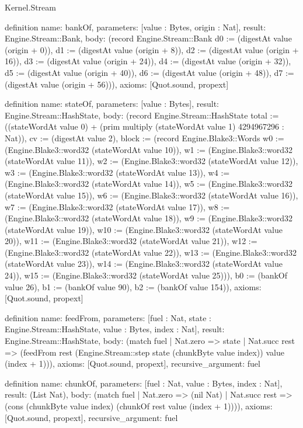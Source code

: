 \begin{lexlean}{Kernel.Stream}
\begin{semanticmodule}
definition{
  name: bankOf,
  parameters: [value : Bytes, origin : Nat],
  result: Engine.Stream::Bank,
  body: (record Engine.Stream::Bank {d0 := (digestAt value (origin + 0)), d1 := (digestAt value (origin + 8)), d2 := (digestAt value (origin + 16)), d3 := (digestAt value (origin + 24)), d4 := (digestAt value (origin + 32)), d5 := (digestAt value (origin + 40)), d6 := (digestAt value (origin + 48)), d7 := (digestAt value (origin + 56))}),
  axioms: [Quot.sound, propext]
}

definition{
  name: stateOf,
  parameters: [value : Bytes],
  result: Engine.Stream::HashState,
  body: (record Engine.Stream::HashState {total := ((stateWordAt value 0) + (prim multiply (stateWordAt value 1) 4294967296 : Nat)), cv := (digestAt value 2), block := (record Engine.Blake3::Words {w0 := (Engine.Blake3::word32 (stateWordAt value 10)), w1 := (Engine.Blake3::word32 (stateWordAt value 11)), w2 := (Engine.Blake3::word32 (stateWordAt value 12)), w3 := (Engine.Blake3::word32 (stateWordAt value 13)), w4 := (Engine.Blake3::word32 (stateWordAt value 14)), w5 := (Engine.Blake3::word32 (stateWordAt value 15)), w6 := (Engine.Blake3::word32 (stateWordAt value 16)), w7 := (Engine.Blake3::word32 (stateWordAt value 17)), w8 := (Engine.Blake3::word32 (stateWordAt value 18)), w9 := (Engine.Blake3::word32 (stateWordAt value 19)), w10 := (Engine.Blake3::word32 (stateWordAt value 20)), w11 := (Engine.Blake3::word32 (stateWordAt value 21)), w12 := (Engine.Blake3::word32 (stateWordAt value 22)), w13 := (Engine.Blake3::word32 (stateWordAt value 23)), w14 := (Engine.Blake3::word32 (stateWordAt value 24)), w15 := (Engine.Blake3::word32 (stateWordAt value 25))}), b0 := (bankOf value 26), b1 := (bankOf value 90), b2 := (bankOf value 154)}),
  axioms: [Quot.sound, propext]
}

definition{
  name: feedFrom,
  parameters: [fuel : Nat, state : Engine.Stream::HashState, value : Bytes, index : Nat],
  result: Engine.Stream::HashState,
  body: (match fuel
    | Nat.zero => state
    | Nat.succ rest => (feedFrom rest (Engine.Stream::step state (chunkByte value index)) value (index + 1))),
  axioms: [Quot.sound, propext],
  recursive_argument: fuel
}

definition{
  name: chunkOf,
  parameters: [fuel : Nat, value : Bytes, index : Nat],
  result: (List Nat),
  body: (match fuel
    | Nat.zero => (nil Nat)
    | Nat.succ rest => (cons (chunkByte value index) (chunkOf rest value (index + 1)))),
  axioms: [Quot.sound, propext],
  recursive_argument: fuel
}


\end{semanticmodule}
\end{lexlean}
